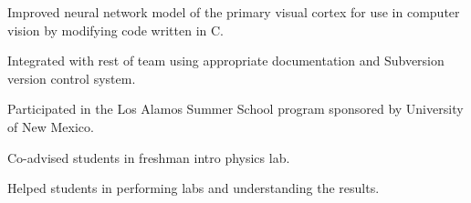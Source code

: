 \documentclass[]{deedy-resume-openfont}
\begin{document}
\begin{minipage}[t]{0.63\textwidth}
\begin{tightemize}
	\regdescript
\item Improved neural network model of the primary visual cortex for use in computer vision by modifying code written in C.\\
\item Integrated with rest of team using appropriate documentation and Subversion version control system.\\
\item Participated in the Los Alamos Summer School program sponsored by University of New
Mexico.
\end{tightemize}
\sectionsep


\begin{tightemize}
	\regdescript
	\item Co-advised students in freshman intro physics lab.\\
	\item  Helped students in performing labs and understanding the results.\\
\end{tightemize}
\sectionsep


\end{minipage}
\end{document}
